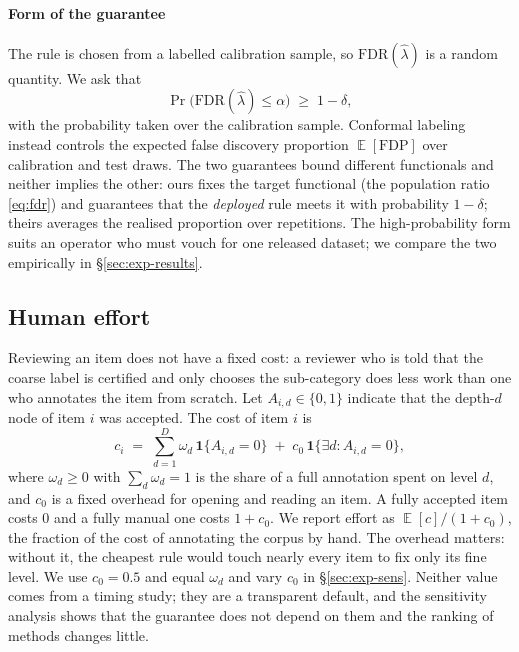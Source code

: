 \documentclass[preprint,12pt]{elsarticle}
\theoremstyle{definition}
\theoremstyle{remark}
\newcommand{\fdr}{\mathrm{FDR}}
\DeclareMathOperator{\E}{\mathbb{E}}
\begin{document}
\paragraph{Form of the guarantee}
The rule is chosen from a labelled calibration sample, so $\fdr(\hat\lambda)$ is
a random quantity. We ask that
\begin{equation}
  \Pr\bigl(\fdr(\hat\lambda) \le \alpha\bigr) \;\ge\; 1-\delta ,
  \label{eq:guarantee}
\end{equation}
with the probability taken over the calibration sample. Conformal labeling
\cite{huang2025selective} instead controls the expected false discovery
proportion $\E[\mathrm{FDP}]$ over calibration and test draws. The two
guarantees bound different functionals and neither implies the other: ours
fixes the target functional (the population ratio \eqref{eq:fdr}) and
guarantees that the \emph{deployed} rule meets it with probability $1-\delta$;
theirs averages the realised proportion over repetitions. The high-probability
form suits an operator who must vouch for one released dataset; we compare the
two empirically in \S\ref{sec:exp-results}.

\subsection{Human effort}

Reviewing an item does not have a fixed cost: a reviewer who is told that the
coarse label is certified and only chooses the sub-category does less work than
one who annotates the item from scratch. Let $A_{i,d}\in\{0,1\}$ indicate that
the depth-$d$ node of item $i$ was accepted. The cost of item $i$ is
\begin{equation}
  c_i \;=\; \sum_{d=1}^{D} \omega_d\,\mathbf{1}\{A_{i,d}=0\}
  \;+\; c_0\,\mathbf{1}\{\exists d: A_{i,d}=0\},
  \label{eq:effort}
\end{equation}
where $\omega_d\ge0$ with $\sum_d \omega_d=1$ is the share of a full annotation spent on
level $d$, and $c_0$ is a fixed overhead for opening and reading an item. A
fully accepted item costs $0$ and a fully manual one costs $1+c_0$. We report
effort as $\E[c]/(1+c_0)$, the fraction of the cost of annotating the corpus by
hand. The overhead matters: without it, the cheapest rule would touch nearly
every item to fix only its fine level. We use $c_0=0.5$ and equal $\omega_d$ and
vary $c_0$ in \S\ref{sec:exp-sens}. Neither value comes from a timing study;
they are a transparent default, and the sensitivity analysis shows that the
guarantee does not depend on them and the ranking of methods changes little.
\end{document}
